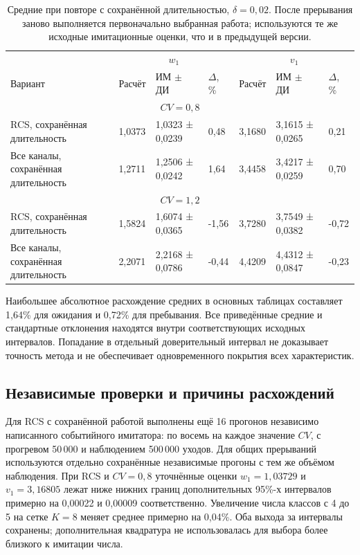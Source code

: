 \documentclass[a4paper,12pt]{article}
\begin{document}
\begin{table}[!htbp]
\centering\small\setlength{\tabcolsep}{2pt}
\begin{tabular}{@{}p{4.16cm}p{1.61cm}p{2.83cm}p{1.28cm}p{1.61cm}p{2.83cm}p{1.28cm}@{}}
\toprule
 & \multicolumn{3}{c}{$w_1$} & \multicolumn{3}{c}{$v_1$} \\
Вариант & Расчёт & ИМ $\pm$ ДИ & $\Delta$, \% & Расчёт & ИМ $\pm$ ДИ & $\Delta$, \% \\
\midrule
\multicolumn{7}{c}{$CV=0,8$} \\
RCS, сохранённая длительность & 1,0373 & 1,0323 ± 0,0239 & 0,48 & 3,1680 & 3,1615 ± 0,0265 & 0,21 \\
Все каналы, сохранённая длительность & 1,2711 & 1,2506 ± 0,0242 & 1,64 & 3,4458 & 3,4217 ± 0,0259 & 0,70 \\
\multicolumn{7}{c}{$CV=1,2$} \\
RCS, сохранённая длительность & 1,5824 & 1,6074 ± 0,0365 & -1,56 & 3,7280 & 3,7549 ± 0,0382 & -0,72 \\
Все каналы, сохранённая длительность & 2,2071 & 2,2168 ± 0,0786 & -0,44 & 4,4209 & 4,4312 ± 0,0847 & -0,23 \\
\bottomrule
\end{tabular}
\caption{Средние при повторе с сохранённой длительностью, $\delta=0{,}02$. После прерывания заново выполняется первоначально выбранная работа; используются те же исходные имитационные оценки, что и в предыдущей версии.}
\label{tab:results_fixed}
\end{table}

Наибольшее абсолютное расхождение средних в основных таблицах составляет 1,64\% для ожидания и 0,72\% для пребывания. Все приведённые средние и стандартные отклонения находятся внутри соответствующих исходных интервалов. Попадание в отдельный доверительный интервал не доказывает точность метода и не обеспечивает одновременного покрытия всех характеристик.

\subsection{Независимые проверки и причины расхождений}
Для RCS с сохранённой работой выполнены ещё 16 прогонов независимо написанного событийного имитатора: по восемь на каждое значение \(CV\), с прогревом 50\,000 и наблюдением 500\,000 уходов. Для общих прерываний используются отдельно сохранённые независимые прогоны с тем же объёмом наблюдения. При RCS и \(CV=0{,}8\) уточнённые оценки \(w_1=1{,}03729\) и \(v_1=3{,}16805\) лежат ниже нижних границ дополнительных 95\%-х интервалов примерно на 0{,}00022 и 0{,}00009 соответственно. Увеличение числа классов с 4 до 5 на сетке \(K=8\) меняет среднее примерно на 0{,}04\%. Оба выхода за интервалы сохранены; дополнительная квадратура не использовалась для выбора более близкого к имитации числа.
\end{document}
